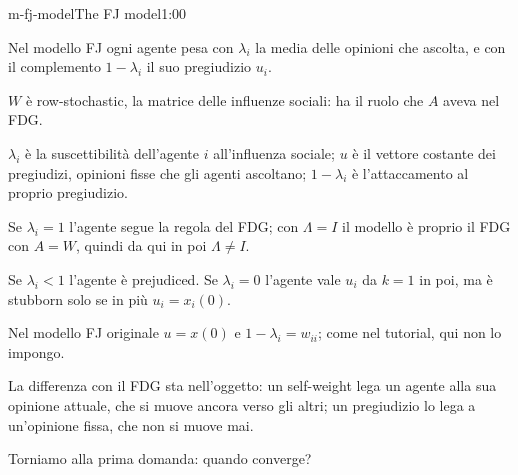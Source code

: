 
\begin{slide}{m-fj-model}{The FJ model}{1:00}
  \begin{discorso}
    \item Nel modello FJ ogni agente pesa con $\lambda_i$ la media delle opinioni che ascolta, e con il complemento $1-\lambda_i$ il suo pregiudizio $u_i$.
    \item $W$ è row-stochastic, la matrice delle influenze sociali: ha il ruolo che $A$ aveva nel FDG.
    \item $\lambda_i$ è la suscettibilità dell'agente $i$ all'influenza sociale; $u$ è il vettore costante dei pregiudizi, opinioni fisse che gli agenti ascoltano; $1-\lambda_i$ è l'attaccamento al proprio pregiudizio.
    \item Se $\lambda_i=1$ l'agente segue la regola del FDG; con $\Lambda=I$ il modello è proprio il FDG con $A=W$, quindi da qui in poi $\Lambda\neq I$.
    \item Se $\lambda_i<1$ l'agente è prejudiced. Se $\lambda_i=0$ l'agente vale $u_i$ da $k=1$ in poi, ma è stubborn solo se in più $u_i=x_i(0)$.
    \item Nel modello FJ originale $u=x(0)$ e $1-\lambda_i=w_{ii}$; come nel tutorial, qui non lo impongo.
    \item La differenza con il FDG sta nell'oggetto: un self-weight lega un agente alla sua opinione attuale, che si muove ancora verso gli altri; un pregiudizio lo lega a un'opinione fissa, che non si muove mai.
    \item Torniamo alla prima domanda: quando converge?
  \end{discorso}
\end{slide}

